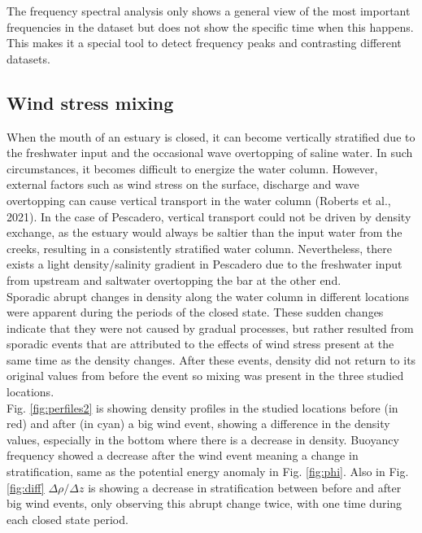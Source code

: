 \documentclass[tesis.tex]{subfiles}
\begin{document}
The frequency spectral analysis only shows a general view of the most important frequencies in the dataset but does not show the specific time when this happens. This makes it a special tool to detect frequency peaks and contrasting different datasets.\\

\subsection{Wind stress mixing}

When the mouth of an estuary is closed, it can become vertically stratified due to the freshwater input and the occasional wave overtopping of saline water. In such circumstances, it becomes difficult to energize the water column. However, external factors such as wind stress on the surface, discharge and wave overtopping can cause vertical transport in the water column (Roberts et al., 2021). In the case of Pescadero, vertical transport could not be driven by density exchange, as the estuary would always be saltier than the input water from the creeks, resulting in a consistently stratified water column. Nevertheless, there exists a light density/salinity gradient in Pescadero due to the freshwater input from upstream and saltwater overtopping the bar at the other end.\\

Sporadic abrupt changes in density along the water column in different locations were apparent during the periods of the closed state. These sudden changes indicate that they were not caused by gradual processes, but rather resulted from sporadic events that are attributed to the effects of wind stress present at the same time as the density changes. After these events, density did not return to its original values from before the event so mixing was present in the three studied locations.\\

Fig. \ref{fig:perfiles2} is showing density profiles in the studied locations before (in red) and after (in cyan) a big wind event, showing a difference in the density values, especially in the bottom where there is a decrease in density. Buoyancy frequency showed a decrease after the wind event meaning a change in stratification, same as the potential energy anomaly in Fig. \ref{fig:phi}. Also in Fig. \ref{fig:diff} $\Delta \rho/\Delta z$ is showing a decrease in stratification between before and after big wind events, only observing this abrupt change twice, with one time during each closed state period.\\
\end{document}

